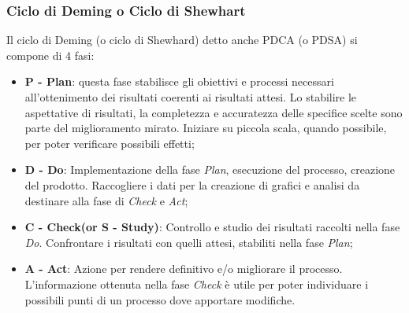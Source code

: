   \subsubsection{Ciclo di Deming o Ciclo di Shewhart}
  Il ciclo di Deming (o ciclo di Shewhard) detto anche PDCA (o PDSA) si compone di 4 fasi:
  \begin{itemize}
    \item \textbf{P - Plan}: questa fase stabilisce gli obiettivi e processi necessari all'ottenimento dei risultati coerenti ai risultati attesi.
    Lo stabilire le aspettative di risultati, la completezza e accuratezza delle specifice scelte sono parte del miglioramento mirato.
    Iniziare su piccola scala, quando possibile, per poter verificare possibili effetti;
    \item \textbf{D - Do}: Implementazione della fase \emph{Plan}, esecuzione del processo, creazione del prodotto.
    Raccogliere i dati per la creazione di grafici e analisi da destinare alla fase di \emph{Check} e \emph{Act};
    \item \textbf{C - Check(or S - Study)}: Controllo e studio dei risultati raccolti nella fase \emph{Do}. Confrontare i risultati con quelli attesi, stabiliti nella fase \emph{Plan};
    \item \textbf{A - Act}: Azione per rendere definitivo e/o migliorare il processo. L'informazione ottenuta nella fase \emph{Check} è utile per poter individuare i possibili punti di un processo dove apportare modifiche.
  \end{itemize}
